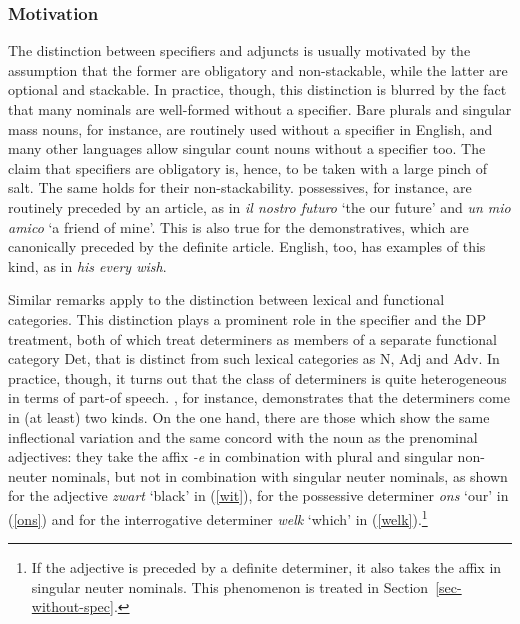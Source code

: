 \documentclass[output=paper
	        ,collection
	        ,collectionchapter
 	        ,biblatex
                ,babelshorthands
                ,newtxmath
                ,draftmode
                ,colorlinks, citecolor=brown
]{langscibook}
\begin{document}
\subsubsection{Motivation} 
\label{motiv}


The distinction between specifiers and adjuncts is usually motivated by 
the assumption that the former are obligatory and non-stackable, while the latter  
are optional and stackable. In practice, though, this distinction 
is blurred by the fact that many nominals are well-formed without a specifier.
Bare plurals and singular mass nouns, for instance, are routinely used without a 
specifier in English, and many other languages allow singular count nouns without 
a specifier too. The claim that specifiers are obligatory is, hence, to be taken 
with a large pinch of salt. The same holds for their non-stackability. 
 possessives, for instance, are routinely preceded by an article, as in 
\emph{il nostro futuro} `the our future' and \emph{un mio amico} `a friend of mine'.     
This is also true for the  demonstratives, which are canonically preceded by the 
definite article. English, too, has examples of this kind, as in \emph{his every wish}.    

Similar remarks apply to the distinction between lexical and functional categories. 
This distinction plays a prominent role in the specifier and the DP treatment, both of which treat 
determiners as members of a separate functional category Det, that is distinct from 
such lexical categories as N, Adj and Adv.
In practice, though, it turns out that the class of determiners is quite heterogeneous in 
terms of part-of speech. \citet{VanEynde06}, for instance, demonstrates that the 
 determiners come in (at least) two kinds. On the one hand, there are those 
which show the same inflectional variation and the same concord with the noun as the 
prenominal adjectives: they take the affix \emph{-e} in combination with plural 
and singular non-neuter nominals, but not in combination with singular 
neuter nominals, as shown for the adjective \emph{zwart} `black' in (\ref{wit}), 
for the possessive determiner \emph{ons} `our' in (\ref{ons}) and for the 
interrogative determiner \emph{welk} `which' in (\ref{welk}).\footnote{If the adjective 
is preceded by a definite determiner, 
it also takes the affix in singular neuter nominals. This phenomenon is treated 
in Section~\ref{sec-without-spec}.} 
\end{document}
